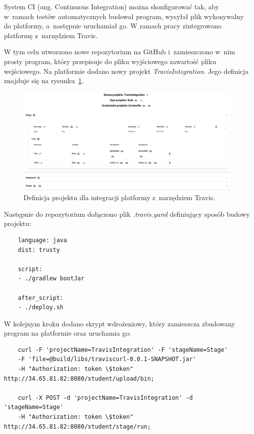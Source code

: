 System CI (ang. Continuous Integration) można skonfigurować tak, aby w~ramach testów automatycznych budował program, wysyłał plik wykonywalny do platformy, a~następnie uruchamiał go.
W ramach pracy zintegrowano platformę z~narzędziem Travis.

W tym celu utworzono nowe repozytorium na GitHub i~zamieszczono w~nim prosty program, który przepisuje do pliku wyjściowego zawartość pliku wejściowego.
Na platformie dodano nowy projekt \textit{TravisIntegration}.
Jego definicja znajduje się na rysunku~\ref{fig:travis_integration}.

\begin{figure}[h]
    \centering
    \includegraphics[width = 12cm]{chapter05/travis_integration.png}
    \caption{Definicja projektu dla integracji platformy z~narzędziem Travis.}
    \label{fig:travis_integration}
\end{figure}

Następnie do repozytorium dołączono plik \textit{.travis.yaml} definiujący sposób budowy projektu:

{\selectfont
\tiny
\begin{lstlisting}
    language: java
    dist: trusty

    script:
    - ./gradlew bootJar

    after_script:
    - ./deploy.sh
\end{lstlisting}
}

W kolejnym kroku dodano skrypt wdrożeniowy, który zamieszcza zbudowany program na platformie oraz uruchamia go:

{\selectfont
\tiny
\begin{lstlisting}
    curl -F 'projectName=TravisIntegration' -F 'stageName=Stage'
    -F 'file=@build/libs/traviscurl-0.0.1-SNAPSHOT.jar'
    -H "Authorization: token \$token" http://34.65.81.82:8080/student/upload/bin;

    curl -X POST -d 'projectName=TravisIntegration' -d 'stageName=Stage'
    -H "Authorization: token \$token" http://34.65.81.82:8080/student/stage/run;
\end{lstlisting}
}

